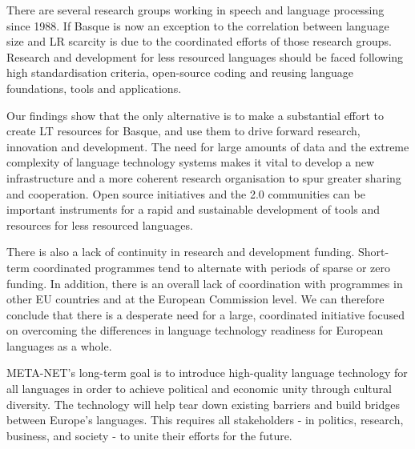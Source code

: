 \begin{multicols}{2}
There are several research groups working in speech and language processing since 1988. If Basque is now an exception to the correlation between language size and LR scarcity is due to the coordinated efforts of those research groups. Research and development for less resourced languages should be faced following high standardisation criteria, open-source coding and reusing   language foundations, tools and applications. 

    Our findings show that the only alternative is to make a substantial effort to create LT resources for Basque, and use them to drive forward research, innovation and development. The need for large amounts of data and the extreme complexity of language technology systems makes it vital to develop a new infrastructure and a more coherent research organisation to spur greater sharing and cooperation. Open source initiatives and the 2.0 communities can be important instruments for a rapid and sustainable development of tools and resources for less resourced languages.

   There is also a lack of continuity in research and development funding. Short-term coordinated programmes tend to alternate with periods of sparse or zero funding. In addition, there is an overall lack of coordination with programmes in other EU countries and at the European Commission level. We can therefore conclude that there is a desperate need for a large, coordinated initiative focused on overcoming the differences in language technology readiness for European languages as a whole.

    META-NET’s long-term goal is to introduce high-quality language technology for all languages in order to achieve political and economic unity through cultural diversity. The technology will help tear down existing barriers and build bridges between Europe’s languages. This requires all stakeholders - in politics, research, business, and society - to unite their efforts for the future. 


\end{multicols}

